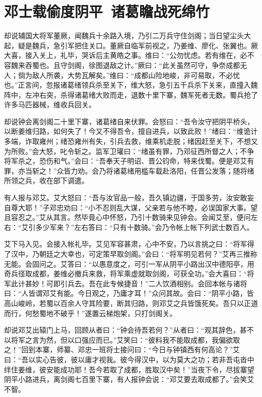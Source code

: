 \chapter{邓士载偷度阴平~诸葛瞻战死绵竹}

却说辅国大将军董厥，闻魏兵十余路入境，乃引二万兵守住剑阁；当日望尘头大起，疑是魏兵，急引军把住关口。董厥自临军前视之，乃姜维、廖化、张翼也。厥大喜，接入关上，礼毕，哭诉后主黄皓之事。维曰：“公勿忧虑。若有维在，必不容魏来吞蜀也。且守剑阁，徐图退敌之计。”厥曰：“此关虽然可守，争奈成都无人；倘为敌人所袭，大势瓦解矣。”维曰：“成都山险地峻，非可易取，不必忧也。”正言间，忽报诸葛绪领兵杀至关下，维大怒，急引五千兵杀下关来，直撞入魏阵中，左冲右突，杀得诸葛绪大败而走，退数十里下寨，魏军死者无数。蜀兵抢了许多马匹器械，维收兵回关。

却说钟会离剑阁二十里下寨，诸葛绪自来伏罪。会怒曰：“吾令汝守把阴平桥头，以断姜维归路，如何失了！今又不得吾令，擅自进兵，以致此败！”绪曰：“维诡计多端，诈取雍州；绪恐雍州有失，引兵去救，维乘机走脱；绪因赶至关下，不想又为所败。”会大怒，叱令斩之。监军卫瓘曰：“绪虽有罪，乃邓征西所督之人；不争将军杀之，恐伤和气。”会曰：“吾奉天子明诏、晋公钧命，特来伐蜀。便是邓艾有罪，亦当斩之！”众皆力劝。会乃将诸葛绪用槛车载赴洛阳，任晋公发落；随将绪所领之兵，收在部下调遣。

有人报与邓艾。艾大怒曰：“吾与汝官品一般，吾久镇边疆，于国多劳，汝安敢妄自尊大耶！”子邓忠劝曰：“小不忍则乱大谋，父亲若与他不睦，必误国家大事。望且容忍之。”艾从其言。然毕竟心中怀怒，乃引十数骑来见钟会。会闻艾至，便问左右：“艾引多少军来？”左右答曰：“只有十数骑。”会乃令帐上帐下列武士数百人。

艾下马入见。会接入帐礼毕。艾见军容甚肃，心中不安，乃以言挑之曰：“将军得了汉中，乃朝廷之大幸也，可定策早取剑阁。”会曰：“将军明见若何？”艾再三推称无能。会固问之。艾答曰：“以愚意度之，可引一军从阴平小路出汉中德阳亭，用奇兵径取成都，姜维必撤兵来救，将军乘虚就取剑阁，可获全功。”会大喜曰：“将军此计甚妙！可即引兵去。吾在此专候捷音！”二人饮酒相别。会回本帐与诸将曰：“人皆谓邓艾有能。今日观之，乃庸才耳！”众问其故。会曰：“阴平小路，皆高山峻岭，若蜀以百余人守其险要，断其归路，则邓艾之兵皆饿死矣。吾只以正道而行，何愁蜀地不破乎！”遂置云梯炮架，只打剑阁关。

却说邓艾出辕门上马，回顾从者曰：“钟会待吾若何？”从者曰：“观其辞色，甚不以将军之言为然，但以口强应而已。”艾笑曰：“彼料我不能取成都，我偏欲取之！”回到本寨，师纂、邓忠一班将士接问曰：“今日与钟镇西有何高论？”艾曰：“吾以实心告彼，彼以庸才视我。彼今得汉中，以为莫大之功；若非吾屯沓中绊住姜维，彼安能成功耶！吾今若取了成都，胜取汉中矣！”当夜下令，尽拔寨望阴平小路进兵，离剑阁七百里下寨，有人报钟会说：“邓艾要去取成都了。”会笑艾不智。

